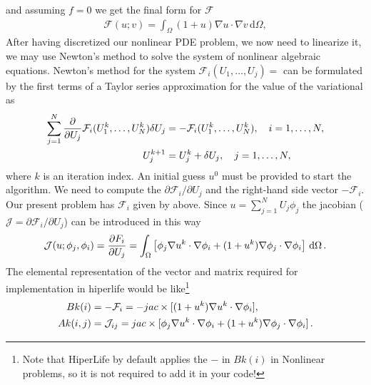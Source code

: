 \documentclass[]{article}
\begin{document}
and assuming $f=0$ we get the final form for $\mathcal{F}$
\begin{equation}\label{eq11}
	\begin{aligned}
		\mathcal{F}(u; v) = \int_\Omega (1+u)\nabla u\cdot \nabla v \, \mathrm{d}\Omega,
	\end{aligned}
\end{equation}
After having discretized our nonlinear PDE problem, we now need to linearize it, we may use Newton’s method to solve the system of nonlinear algebraic equations. Newton’s method for the system $\mathcal{F}_i(U_1,\ldots,U_j)=$ can be formulated by the first terms of a Taylor series approximation for the value of the variational as
\begin{equation}\label{eq12}
	\begin{aligned}
		\sum_{j=1}^N {\partial \over\partial U_j} \mathcal{F}_i(U_1^k,\ldots,U_N^k)\delta U_j &= -\mathcal{F}_i(U_1^k,\ldots,U_N^k),\quad i=1, \ldots ,N,\\ U_j^{k+1} &= U_j^k + \delta U_j,\quad j=1, \ldots ,N,
	\end{aligned}
\end{equation}
where $k$ is an iteration index. An initial guess $u^0$ must be provided to start the algorithm.
We need to compute the $\partial \mathcal{F}_i/\partial U_j$ and the right-hand side vector $-\mathcal{F}_i$. Our present problem has $\mathcal{F}_i$ given by above. Since $u = \sum_{j=1}^N U_j \phi_j$ the jacobian ($\mathcal{J}=\partial \mathcal{F}_i/\partial U_j$) can be introduced in this way
\begin{equation}\label{eq13}
	\begin{aligned}
		\mathcal{J}(u;\phi_j,\phi_i) = {\partial F_i\over\partial U_j} = \int_\Omega \left\lbrack \phi_j \nabla u^k \cdot \nabla \phi_i + (1+u^k) \nabla \phi_j \cdot \nabla \phi_i \right\rbrack \, \mathrm{d}\Omega\thinspace .
	\end{aligned}
\end{equation}
The elemental representation of the vector and matrix required for implementation in hiperlife would be like\footnote{Note that HiperLife by default applies the $-$ in $Bk(i)$ in Nonlinear problems, so it is not required to add it in your code!}
\begin{equation}\label{eq14}
	\begin{aligned}[b]
		Bk(i) &= -\mathcal{F}_i = \mathcolor{red}{-}jac \times[(1+u^k)\nabla u^k\cdot \nabla \phi_i], \\
		Ak(i,j) &=  \mathcal{J}_{ij} = jac \times [\phi_j \nabla u^k \cdot \nabla \phi_i + (1+u^k) \nabla \phi_j \cdot \nabla \phi_i]\thinspace .
	\end{aligned}
\end{equation}
\end{document}
